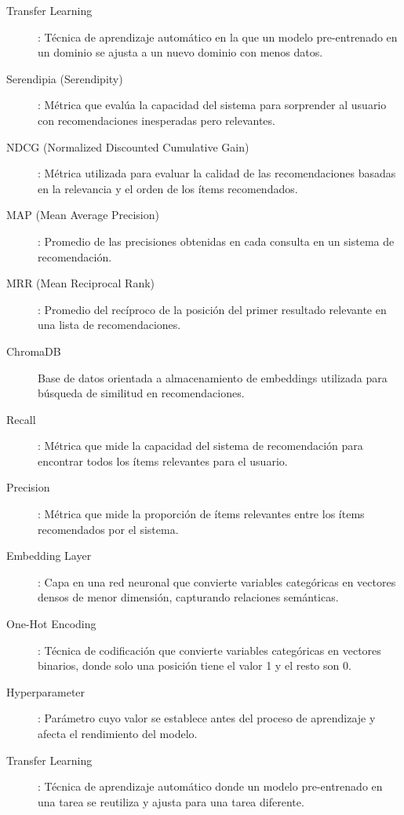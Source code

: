 \documentclass[11pt,a4paper,twoside]{thesis}
\begin{document}
\begin{description}
	\item[Transfer Learning]: Técnica de aprendizaje automático en la que un modelo pre-entrenado en un dominio se ajusta a un nuevo dominio con menos datos.
	\item[Serendipia (Serendipity)]: Métrica que evalúa la capacidad del sistema para sorprender al usuario con recomendaciones inesperadas pero relevantes.
	\item[NDCG (Normalized Discounted Cumulative Gain)]: Métrica utilizada para evaluar la calidad de las recomendaciones basadas en la relevancia y el orden de los ítems recomendados.
	\item[MAP (Mean Average Precision)]: Promedio de las precisiones obtenidas en cada consulta en un sistema de recomendación.
	\item[MRR (Mean Reciprocal Rank)]: Promedio del recíproco de la posición del primer resultado relevante en una lista de recomendaciones.
	\item[ChromaDB] Base de datos orientada a almacenamiento de embeddings utilizada para búsqueda de similitud en recomendaciones.
	\item[Recall]: Métrica que mide la capacidad del sistema de recomendación para encontrar todos los ítems relevantes para el usuario.
	\item[Precision]: Métrica que mide la proporción de ítems relevantes entre los ítems recomendados por el sistema.
	\item[Embedding Layer]: Capa en una red neuronal que convierte variables categóricas en vectores densos de menor dimensión, capturando relaciones semánticas.
	\item[One-Hot Encoding]: Técnica de codificación que convierte variables categóricas en vectores binarios, donde solo una posición tiene el valor 1 y el resto son 0.
	\item[Hyperparameter]: Parámetro cuyo valor se establece antes del proceso de aprendizaje y afecta el rendimiento del modelo.
	\item[Transfer Learning]: Técnica de aprendizaje automático donde un modelo pre-entrenado en una tarea se reutiliza y ajusta para una tarea diferente.
\end{description}


\printbibliography[title=Referencias]
\end{document}
